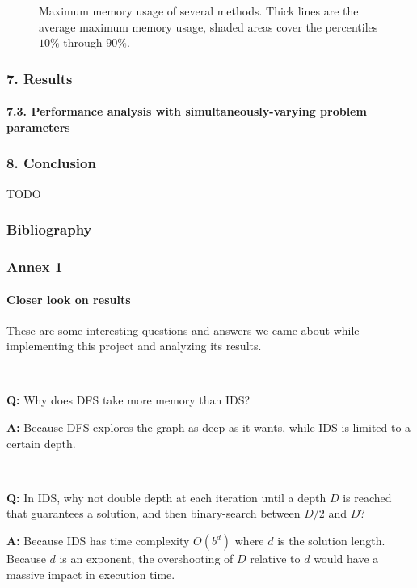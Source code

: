 \documentclass{beamer}
\begin{document}
\begin{frame}
\begin{figure}
    \caption{Maximum memory usage of several methods. Thick lines are the average maximum memory usage, shaded areas cover the percentiles $10\%$ through $90\%$.}
  \end{figure}

\end{frame}

\begin{frame}
  \frametitle{7. Results}
  \framesubtitle{7.3. Performance analysis with simultaneously-varying problem parameters}



\end{frame}

\begin{frame}
\frametitle{8. Conclusion}

TODO

\end{frame}

\begin{frame}
  \frametitle{Bibliography}
  
  
  
\end{frame}

\begin{frame}
  \frametitle{Annex 1}
  \framesubtitle{Closer look on results}

  These are some interesting questions and answers we came about while implementing this project and analyzing its results.

  ~
  
  \textbf{Q:} Why does DFS take more memory than IDS?
  
  \textbf{A:} Because DFS explores the graph as deep as it wants, while IDS is limited to a certain depth.
  
  ~

  \textbf{Q:} In IDS, why not double depth at each iteration until a depth $D$ is reached that guarantees a solution, and then binary-search between $D/2$ and $D$?

  \textbf{A:} Because IDS has time complexity $O(b^d)$ where $d$ is the solution length. Because $d$ is an exponent, the overshooting of $D$ relative to $d$ would have a massive impact in execution time.

\end{frame}
\end{document}
